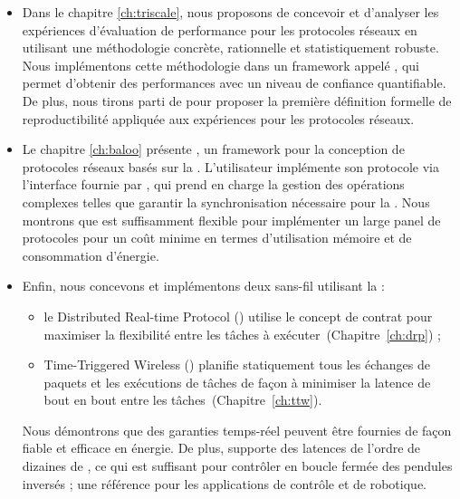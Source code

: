 \begin{itemize}

  \item
  \startsquarepar
  Dans le chapitre \ref{ch:triscale}, nous proposons de concevoir et d'analyser les expériences d'évaluation de performance pour les protocoles réseaux en utilisant une méthodologie concrète, rationnelle et statistiquement robuste.
  Nous implémentons cette méthodologie dans un framework appelé \triscale, qui permet d'obtenir des performances avec un niveau de confiance quantifiable.
  De plus, nous tirons parti de \triscale pour proposer la première définition formelle de reproductibilité appliquée aux expériences pour les protocoles réseaux.
  \stopsquarepar

  \item
  Le chapitre \ref{ch:baloo} présente \baloo, un framework pour la conception de protocoles réseaux basés sur la \ST.
  L'utilisateur implémente son protocole via l'interface fournie par \baloo, qui prend en charge la gestion des opérations complexes telles que garantir la synchronisation nécessaire pour la \ST.
  Nous montrons que \baloo est suffisamment flexible pour implémenter un large panel de protocoles pour un coût minime en termes d'utilisation mémoire et de consommation d'énergie.

  \item
  Enfin, nous concevons et implémentons deux \CPS sans-fil utilisant la \ST :
  {\setlength{\parskip}{0pt}%
    \begin{itemize}[nosep]
      \item
      le Distributed Real-time Protocol (\DRP) utilise le concept de contrat pour maximiser la flexibilité entre les tâches à exécuter~(Chapitre~\ref{ch:drp}) ;
      \item
      Time-Triggered Wireless (\TTW) planifie statiquement tous les échanges de paquets et les exécutions de tâches de façon à minimiser la latence de bout en bout entre les tâches~(Chapitre~\ref{ch:ttw}).
    \end{itemize}
    \startsquarepar
    Nous démontrons que des garanties temps-réel peuvent être fournies de façon fiable et efficace en énergie.
    De plus, \TTW supporte des latences de l'ordre de dizaines de \ms, ce qui est suffisant pour contrôler en boucle fermée des pendules inversés ; une référence pour les applications de contrôle et de robotique.
    \stopsquarepar
  }

\end{itemize}

